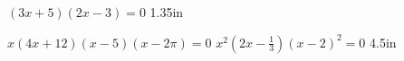 {
    \centering
    $(3x+5)(2x-3) = 0$
}
{1.35in}


\myProblems
{
    \centering
    $x(4x+12)(x-5)(x-2\pi) = 0$
}
{
    \centering
    $x^2(2x-\frac{1}{3})(x-2)^2 = 0$
}
{4.5in}